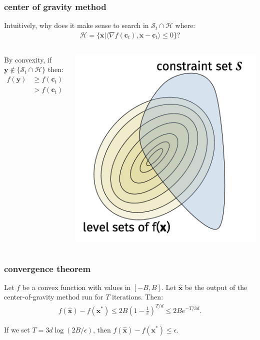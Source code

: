 \documentclass[compress]{beamer}
\newcommand{\bv}[1]{\mathbf{#1}}
\begin{document}
\begin{frame}[t]
	\frametitle{center of gravity method}
	Intuitively, why does it make sense to search in $\mathcal{S}_t \cap \mathcal{H}$ where:
	\begin{align*}
		\mathcal{H} = \{\bv{x} \big\vert \langle \nabla f(\bv{c}_t), \bv{x}-\bv{c}_t\rangle \leq 0\}?
	\end{align*}
	
	\begin{columns}
		\begin{column}{.45\textwidth}
			By convexity, if $\bv{y} \notin \{\mathcal{S}_t \cap \mathcal{H}\}$ then:
			\begin{align*}
				f(\bv{y}) &\geq f(\bv{c}_t) +  \langle\nabla f(\bv{c}_t), \bv{y}-\bv{c}_t\rangle\\ &> f(\bv{c}_t)
			\end{align*}
		\end{column}
		\begin{column}{.55\textwidth}
			\includegraphics[width=\textwidth]{level_sets_constrained.png}
		\end{column}
	\end{columns}
	
\end{frame}

\begin{frame}[t]
	\frametitle{convergence theorem}
	\begin{theorem}
		Let $f$ be a convex function with values in $[-B,B]$.
		Let $\hat{\bv{x}}$ be the output of the center-of-gravity method run for $T$ iterations. Then:
		\begin{align*}
			f(\hat{\bv{x}}) - f(\bv{x}^*) \leq 2B \left(1-\frac{1}{e}\right)^{T/d} \leq 2B e^{-T/3d}.
		\end{align*}
	\end{theorem}
	If we set $T = 3d\log(2B/\epsilon)$, then $f(\hat{\bv{x}}) - f(\bv{x}^*) \leq \epsilon$. 
\end{frame}
\end{document}
